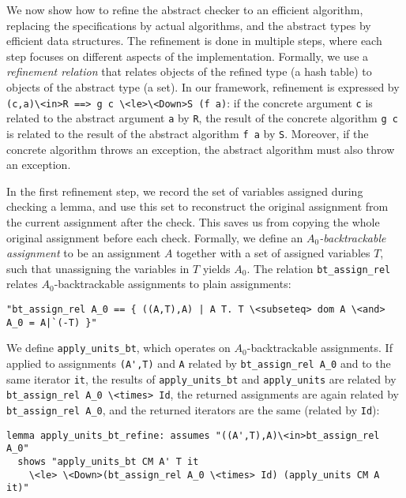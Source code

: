 \documentclass{llncs}
\newcommand{\isai}{\lstinline[language=isabelle,basicstyle=\normalsize\ttfamily\slshape]}
\begin{document}
We now show how to refine the abstract checker to an efficient algorithm, replacing the specifications by actual algorithms,
and the abstract types by efficient data structures.
The refinement is done in multiple steps, where each step focuses on different aspects of the implementation. 
Formally, we use a \emph{refinement relation} that relates objects of the refined type (\eg a hash table) to 
objects of the abstract type (\eg a set). In our framework, refinement is expressed 
by \isai{(c,a)\<in>R ==> g c \<le>\<Down>S (f a)}: if the concrete argument \isai$c$ is related to the abstract argument \isai$a$ by \isai$R$, the result of the concrete
algorithm \isai$g c$ is related to the result of the abstract algorithm \isai$f a$ by \isai$S$. Moreover, if the concrete algorithm throws an exception, 
the abstract algorithm must also throw an exception.

In the first refinement step, we record the set of variables assigned during checking a lemma, 
and use this set to reconstruct the original assignment from the current assignment after the check. 
This saves us from copying the whole original assignment before each check.
Formally, we define an \emph{$A_0$-backtrackable assignment} to be an assignment $A$ together with a set of assigned variables $T$, such that
unassigning the variables in $T$ yields $A_0$. The relation \isai{bt_assign_rel} relates $A_0$-backtrackable assignments to plain assignments:
\begin{lstlisting}
"bt_assign_rel A_0 == { ((A,T),A) | A T. T \<subseteq> dom A \<and> A_0 = A|`(-T) }"
\end{lstlisting}
We define \isai{apply_units_bt}, which operates on $A_0$-backtrackable assignments. If applied 
to assignments \isai$(A',T)$ and \isai$A$ related by \isai{bt_assign_rel A_0} and to the same iterator \isai$it$, the results of 
\isai{apply_units_bt} and \isai{apply_units} are related by \isai{bt_assign_rel A_0 \<times> Id}, \ie the returned assignments 
are again related by \isai{bt_assign_rel A_0}, and the returned iterators are the same (related by \isai{Id}):
\begin{lstlisting}
lemma apply_units_bt_refine: assumes "((A',T),A)\<in>bt_assign_rel A_0"
  shows "apply_units_bt CM A' T it 
    \<le> \<Down>(bt_assign_rel A_0 \<times> Id) (apply_units CM A it)"
\end{lstlisting}
\end{document}
